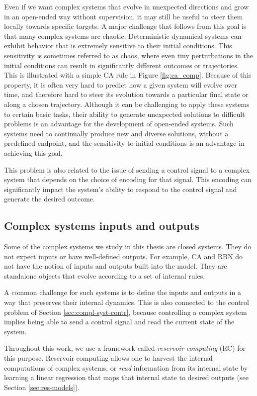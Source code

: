 Even if we want complex systems that evolve in unexpected directions and grow in
an open-ended way without supervision, it may still be useful to steer them
locally towards specific targets. A major challenge that follows from this goal
is that many complex systems are chaotic. Deterministic dynamical systems can 
exhibit behavior that is extremely sensitive to their initial conditions. This sensitivity 
is sometimes referred to as chaos, where even tiny perturbations in the initial conditions 
can result in significantly different outcomes or trajectories. This is illustrated 
with a simple \ac{CA} rule in Figure \ref{fig:ca_comp}. 
Because of this property, it is often very hard to predict how a
given system will evolve over time, and therefore hard to steer its evolution
towards a particular final state or along a chosen trajectory. Although it can be challenging 
to apply these systems to certain basic tasks, their ability to generate unexpected solutions 
to difficult problems is an advantage for the development of open-ended systems. Such systems 
need to continually produce new and diverse solutions, without a 
predefined endpoint, and the sensitivity to initial conditions is an advantage in 
achieving this goal.

This problem is also related to the issue of sending a control signal to a
complex system that depends on the choice of encoding for that signal. This
encoding can significantly impact the system's ability to respond to the control 
signal and generate the desired outcome. 

\subsection{Complex systems inputs and outputs\label{sec:compl-syst-inputs}}

Some of the complex systems we study in this thesis are closed systems. They do
not expect inputs or have well-defined outputs. For example, \ac{CA} and
\ac{RBN} do not have the notion of inputs and outputs built into the model. They
are standalone objects that evolve according to a set of internal rules.

A common challenge for such systems is to define the inputs and outputs in a way
that preserves their internal dynamics. This is also connected to the control
problem of Section \ref{sec:compl-syst-contr}, because controlling a complex
system implies being able to send a control signal and read the current
state of the system.

Throughout this work, we use a framework called \emph{reservoir computing} (RC) for this 
purpose. Reservoir
computing allows one to harvest the internal computations of complex systems, or
\emph{read} information from its internal state by learning a linear regression
that maps that internal state to desired outputs (see Section
\ref{sec:res-models}).



